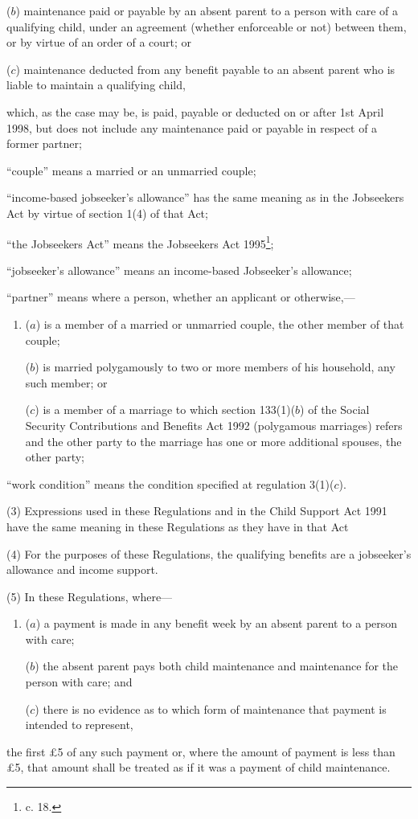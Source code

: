 \documentclass[12pt,a4paper]{article}
\begin{document}
\begin{enumerate}
\begin{enumerate}
    ($b$) 
    maintenance paid or payable by an absent parent to a person with care of a qualifying child, under an agreement (whether enforceable or not) between them, or by virtue of an order of a court; or

    ($c$) 
    maintenance deducted from any benefit payable to an absent parent who is liable to maintain a qualifying child,
\end{enumerate}
    which, as the case may be, is paid, payable or deducted on or after 1st April 1998, but does not include any maintenance paid or payable in respect of a former partner;

“couple” means a married or an unmarried couple;

“income-based jobseeker’s allowance” has the same meaning as in the Jobseekers Act by virtue of section 1(4) of that Act;

“the Jobseekers Act” means the Jobseekers Act 1995\footnote{ c. 18.};

\begin{sloppypar}
“jobseeker’s allowance” means an income-based Jobseeker’s allowance;
\end{sloppypar}

“partner” means where a person, whether an applicant or otherwise,—
\begin{enumerate}\item[]
($a$) is a member of a married or unmarried couple, the other member of that couple;

($b$) is married polygamously to two or more members of his household, any such member; or

($c$) is a member of a marriage to which section 133(1)($b$) of the Social Security Contributions and Benefits Act 1992 (polygamous marriages) refers and the other party to the marriage has one or more additional spouses, the other party;
\end{enumerate}

“work condition” means the condition specified at regulation 3(1)($c$).
\end{enumerate}

(3) Expressions used in these Regulations and in the Child Support Act 1991 have the same meaning in these Regulations as they have in that Act

(4) For the purposes of these Regulations, the qualifying benefits are a jobseeker’s allowance and income support.

(5) In these Regulations, where—
\begin{enumerate}\item[]
($a$) a payment is made in any benefit week by an absent parent to a person with care;

($b$) the absent parent pays both child maintenance and maintenance for the person with care; and

($c$) there is no evidence as to which form of maintenance that payment is intended to represent,
\end{enumerate}
the first £5 of any such payment or, where the amount of payment is less than £5, that amount shall be treated as if it was a payment of child maintenance.
\end{document}
